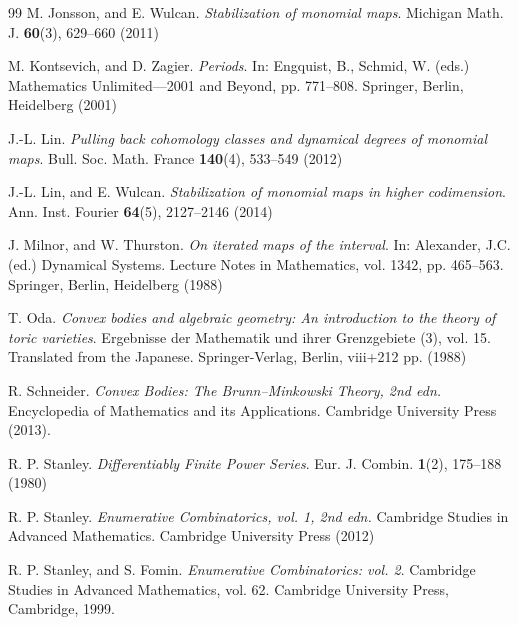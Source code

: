 \documentclass[11pt,a4paper]{article}
\theoremstyle{plain}
\theoremstyle{remark}
\theoremstyle{custombold}
\begin{document}
\begin{thebibliography}{99}
 M. Jonsson, and E. Wulcan. \textit{Stabilization of monomial maps}. Michigan Math. J. \textbf{60}(3), 629--660 (2011)



 M. Kontsevich, and D. Zagier. \textit{Periods}. In: Engquist, B., Schmid, W. (eds.) Mathematics Unlimited---2001 and Beyond, pp. 771--808. Springer, Berlin, Heidelberg (2001)

 J.-L. Lin. \textit{Pulling back cohomology classes and dynamical degrees of monomial maps}. Bull. Soc. Math. France \textbf{140}(4), 533--549 (2012)

 J.-L. Lin, and E. Wulcan. \textit{Stabilization of monomial maps in higher codimension}. Ann. Inst. Fourier \textbf{64}(5), 2127--2146 (2014)

 J. Milnor, and W. Thurston. \textit{On iterated maps of the interval}. In: Alexander, J.C. (ed.) Dynamical Systems. Lecture Notes in Mathematics, vol. 1342, pp. 465--563. Springer, Berlin, Heidelberg (1988)

 T. Oda. \textit{Convex bodies and algebraic geometry: An introduction to the theory of toric varieties}. Ergebnisse der Mathematik und ihrer Grenzgebiete (3), vol. 15. Translated from the Japanese. Springer-Verlag, Berlin, viii+212 pp. (1988)

 R. Schneider. \textit{Convex Bodies: The Brunn--Minkowski Theory, 2nd edn.} Encyclopedia of Mathematics and its Applications. Cambridge University Press (2013).


 R. P. Stanley. \textit{Differentiably Finite Power Series}. Eur. J. Combin. \textbf{1}(2), 175--188 (1980)


 R. P. Stanley. \textit{Enumerative Combinatorics, vol. 1, 2nd edn.} Cambridge Studies in Advanced Mathematics. Cambridge University Press (2012)

 R. P. Stanley, and S. Fomin. \textit{Enumerative Combinatorics: vol. 2}. Cambridge Studies in Advanced Mathematics, vol. 62. Cambridge University Press, Cambridge, 1999.



\end{thebibliography}
\end{document}
